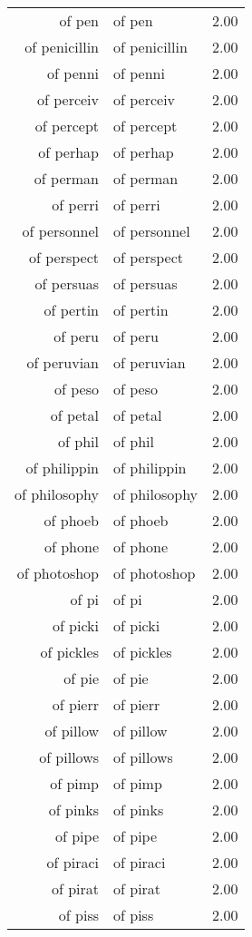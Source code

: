 \begin{table}[ht]
\begin{tabular}{rlr}
  of pen & of pen & 2.00 \\ 
  of penicillin & of penicillin & 2.00 \\ 
  of penni & of penni & 2.00 \\ 
  of perceiv & of perceiv & 2.00 \\ 
  of percept & of percept & 2.00 \\ 
  of perhap & of perhap & 2.00 \\ 
  of perman & of perman & 2.00 \\ 
  of perri & of perri & 2.00 \\ 
  of personnel & of personnel & 2.00 \\ 
  of perspect & of perspect & 2.00 \\ 
  of persuas & of persuas & 2.00 \\ 
  of pertin & of pertin & 2.00 \\ 
  of peru & of peru & 2.00 \\ 
  of peruvian & of peruvian & 2.00 \\ 
  of peso & of peso & 2.00 \\ 
  of petal & of petal & 2.00 \\ 
  of phil & of phil & 2.00 \\ 
  of philippin & of philippin & 2.00 \\ 
  of philosophy & of philosophy & 2.00 \\ 
  of phoeb & of phoeb & 2.00 \\ 
  of phone & of phone & 2.00 \\ 
  of photoshop & of photoshop & 2.00 \\ 
  of pi & of pi & 2.00 \\ 
  of picki & of picki & 2.00 \\ 
  of pickles & of pickles & 2.00 \\ 
  of pie & of pie & 2.00 \\ 
  of pierr & of pierr & 2.00 \\ 
  of pillow & of pillow & 2.00 \\ 
  of pillows & of pillows & 2.00 \\ 
  of pimp & of pimp & 2.00 \\ 
  of pinks & of pinks & 2.00 \\ 
  of pipe & of pipe & 2.00 \\ 
  of piraci & of piraci & 2.00 \\ 
  of pirat & of pirat & 2.00 \\ 
  of piss & of piss & 2.00 \\ 

\end{tabular}
\end{table}
